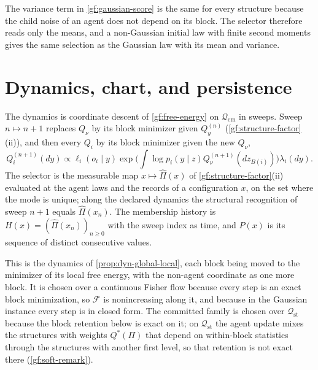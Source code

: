 The variance term in \cref{gf:gaussian-score} is the same for every
structure because the child noise of an agent does not depend on its block.
The selector therefore reads only the means, and a non-Gaussian initial law
with finite second moments gives the same selection as the Gaussian law with
its mean and variance.

\section{Dynamics, chart, and persistence}
\label{gf:sec-dynamics}

The dynamics is coordinate descent of \cref{gf:free-energy} on
$\mathcal Q_{\mathrm{cm}}$ in sweeps. Sweep $n\mapsto n+1$ replaces $Q_\nu$ by
its block minimizer given $Q_y^{(n)}$ (\cref{gf:structure-factor}(ii)), and
then every $Q_i$ by its block minimizer given the new $Q_\nu$,
\begin{equation}
 Q_i^{(n+1)}(dy)\propto\ell_i(o_i\mid y)\exp\Big(\int\log p_i(y\mid z)
 Q_\nu^{(n+1)}(dz_{B(i)})\Big)\lambda_i(dy).
 \label{gf:agent-update}
\end{equation}
The selector is the measurable map $x\mapsto\hat\Pi(x)$ of
\cref{gf:structure-factor}(ii) evaluated at the agent laws and the records of
a configuration $x$, on the set where the mode is unique; along the declared
dynamics the structural recognition of sweep $n+1$ equals $\hat\Pi(x_n)$.
The membership history is $H(x)=(\hat\Pi(x_n))_{n\geq0}$ with the sweep index
as time, and $P(x)$ is its sequence of distinct consecutive values.

This is the dynamics of \cref{prop:dyn-global-local}, each block being moved
to the minimizer of its local free energy, with the non-agent coordinate as
one more block. It is chosen over a continuous Fisher flow because every
step is an exact block minimization, so $\mathcal F$ is nonincreasing along
it, and because in the Gaussian instance every step is in closed form. The
committed family is chosen over $\mathcal Q_{\mathrm{st}}$ because the block
retention below is exact on it; on $\mathcal Q_{\mathrm{st}}$ the agent update
mixes the structures with weights $Q^*(\Pi)$ that depend on within-block
statistics through the structures with another first level, so that
retention is not exact there (\cref{gf:soft-remark}).

